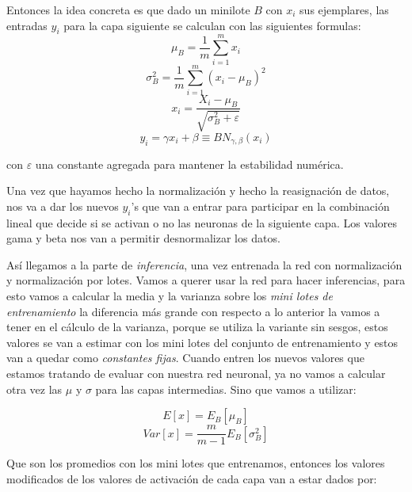 Entonces la idea concreta es que dado un minilote $B$ con $x_i$ sus ejemplares, las entradas $y_i$ para la capa siguiente se
calculan con las siguientes formulas:
  \begin{equation}
   \mu_{B} = \dfrac{1}{m}\sum_{i=1}^{m}x_{i} 
  \end{equation}
  \begin{equation}
   \sigma_{B}^{2} = \dfrac{1}{m}\sum_{i=1}^{m}(x_{i}-\mu_{B})^2 
  \end{equation}
  \begin{equation}
   x_{i} = \dfrac{X_{i}-\mu_{B}}{\sqrt{ \sigma_{B}^{2} + \varepsilon}}
  \label{eq:tres}
  \end{equation}
  \begin{equation}
   y_{i} = \gamma x_{i}+\beta \equiv BN_{\gamma,\beta}(x_{i})
  \label{eq:tres}
  \end{equation}

con $\varepsilon$ una constante agregada para mantener la estabilidad numérica.

Una vez que hayamos hecho la normalización y hecho la reasignación de datos, nos va a dar los nuevos $y_i$'s que van a entrar para participar en la combinación lineal que decide si se activan o no las neuronas de la siguiente capa. Los valores gama y beta nos van a permitir desnormalizar los datos. 

Así llegamos a la parte de \emph{inferencia}, una vez entrenada la red con normalización y normalización por lotes. Vamos a querer usar la red para hacer inferencias, para esto vamos a calcular la media y la varianza sobre los \textit{mini lotes de entrenamiento} la diferencia más grande con respecto a lo  anterior la vamos a tener en el cálculo de la varianza, porque se utiliza la variante sin sesgos, estos valores se van a estimar con los mini lotes del conjunto de entrenamiento y estos van a quedar como \textit{constantes fijas}. Cuando entren los nuevos valores que estamos tratando de evaluar con nuestra red neuronal, ya no vamos a calcular otra vez las $\mu$ y $\sigma$ para las capas intermedias. Sino que vamos a utilizar:

  \begin{equation}
   E[x] = E_{B}[\mu_{B}]
  \end{equation}
  \begin{equation}
   Var[x] = \dfrac{m}{m-1}E_{B}[\sigma_{B}^2] 
  \end{equation}
  

Que son los promedios con los mini lotes que entrenamos, entonces  los valores modificados de los valores de activación de cada capa van a estar dados por:


